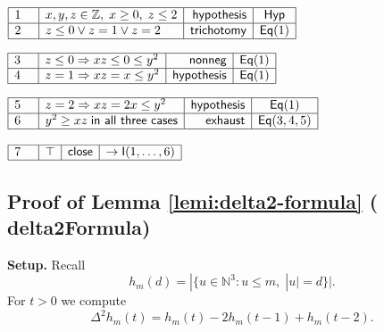 \documentclass[11pt,reqno]{amsart}
\providecommand{\N}{\mathbb{N}}
\providecommand{\Z}{\mathbb{Z}}
\begin{document}
\noindent $%
\begin{array}{|m{0.5cm}|l|r|c|}
\hline
1 & x,y,z\in \Z,\;x\geq 0,\;z\leq 2 & \mathsf{hypothesis} & \mathsf{Hyp} \\ 
\hline
2 & z\leq 0\vee z=1\vee z=2 & \mathsf{trichotomy} & \mathsf{Eq}(1) \\ \hline
\end{array}%
$

\nointerlineskip\noindent$%
\begin{array}{|m{0.5cm}|l|r|c|}
\hline
3 & z\le0\Rightarrow xz\le0\le y^{2} & \mathsf{nonneg} & \mathsf{Eq}(1) \\ 
\hline
4 & z=1\Rightarrow xz=x\le y^{2} & \mathsf{hypothesis} & \mathsf{Eq}(1) \\ 
\hline
\end{array}%
$

\nointerlineskip\noindent$%
\begin{array}{|m{0.5cm}|l|r|c|}
\hline
5 & z=2\Rightarrow xz=2x\le y^{2} & \mathsf{hypothesis} & \mathsf{Eq}(1) \\ 
\hline
6 & y^{2}\ge xz\;\mathsf{in\ all\ three\ cases} & \mathsf{exhaust} & \mathsf{%
Eq}(3,4,5) \\ \hline
\end{array}%
$

\nointerlineskip\noindent$%
\begin{array}{|m{0.5cm}|l|r|c|}
\hline
7 & \top & \mathsf{close} & \to\mathsf{I}(1,\dots,6) \\ \hline
\end{array}%
$

\medskip

\subsection*{Proof of Lemma \protect\ref{lemi:delta2-formula} (\textsf{%
delta2Formula})}

\noindent \textbf{Setup.} Recall%
\begin{equation*}
h_{m}(d)=|\{u\in \N^{3}:u\leq m,\;|u|=d\}|.
\end{equation*}%
\noindent%
For $t>0$ we compute 
\begin{equation*}
\Delta ^{2}h_{m}(t)=h_{m}(t)-2h_{m}(t-1)+h_{m}(t-2).
\end{equation*}

\bigskip 
\end{document}
